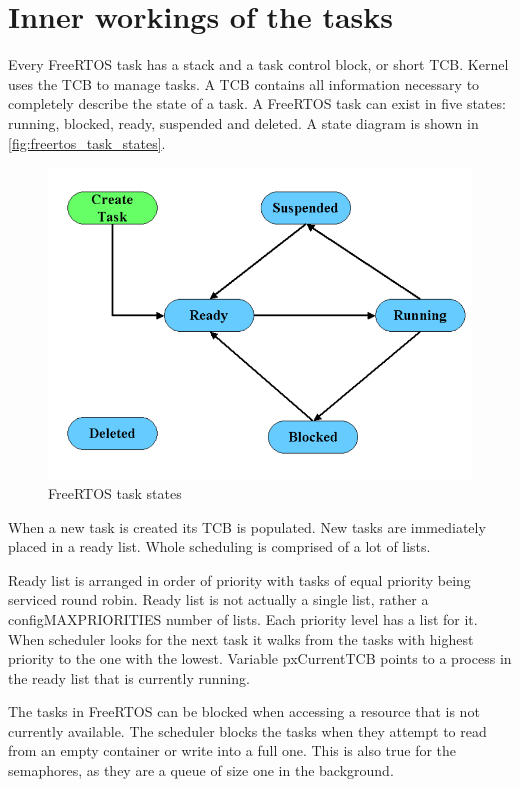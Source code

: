 \section{Inner workings of the tasks}
 

Every FreeRTOS task has a stack and a task control block, or short TCB. Kernel uses the TCB to manage tasks. A TCB contains all information necessary to completely describe the state of a task. \citep{freertos_inner_workings} A FreeRTOS task can exist in five states: running, blocked, ready, suspended and deleted. A state diagram is shown in \autoref{fig:freertos_task_states}.

\begin{figure}[H]

      \centering
      \includegraphics[width=0.7\linewidth]{images/freertos_task_states.png}
      \caption{FreeRTOS task states\citep[p~10]{freertos_inner_workings}}
      \label{fig:freertos_task_states}
    
\end{figure}

When a new task is created its TCB is populated. New tasks are immediately placed in a ready list. Whole scheduling is comprised of a lot of lists.

Ready list is arranged in order of priority with tasks of equal priority being serviced round robin. Ready list is not actually  a single list, rather a configMAX\textunderscore PRIORITIES number of lists. Each priority level has a list for it. When scheduler looks for the next task it walks from the tasks with highest priority to the one with the lowest. Variable pxCurrentTCB points to a process in the ready list that is currently running.

The tasks in FreeRTOS can be blocked when accessing a resource that is not currently available. The scheduler blocks the tasks when they attempt to read from an empty container or write into a full one. This is also true for the semaphores, as they are a queue of size one in the background.

